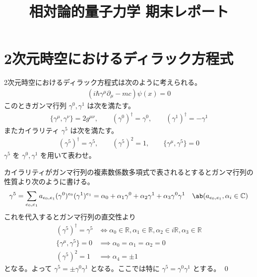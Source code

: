 \documentclass[uplatex,dvipdfmx,a4paper,11pt]{jlreq}
\title{相対論的量子力学 期末レポート}
\author{}
\makeatletter
\newcommand{\CC}{\mathbb{C}}
\newcommand{\RR}{\mathbb{R}}
\numberwithin{equation}{section}
\theoremstyle{definition}
\renewenvironment{proof}[1][\proofname]{\par
  \normalfont
  \topsep6\p@\@plus6\p@ \trivlist
  \item[\hskip\labelsep{\bfseries #1}\@addpunct{\bfseries}]\ignorespaces\quad\par
}{%
  \qed\endtrivlist\@endpefalse
}
\renewcommand\proofname{証明}
\makeatother
\begin{document}
\maketitle
\tableofcontents
\clearpage

\section{2次元時空におけるディラック方程式}
\begin{problem}
2次元時空におけるディラック方程式は次のように考えられる。
\begin{align}
  (i\hbar\gamma^\mu\partial_\mu - mc)\psi(x) = 0
\end{align}
このときガンマ行列 $\gamma^0, \gamma^1$ は次を満たす。
\begin{align}
  \lbrace\gamma^\mu, \gamma^\nu\rbrace = 2g^{\mu\nu}, \qquad (\gamma^0)^\dagger = \gamma^0, \qquad (\gamma^1)^\dagger = - \gamma^1
\end{align}
またカイラリティ $\gamma^5$ は次を満たす。
\begin{align}
  (\gamma^5)^\dagger = \gamma^5, \qquad (\gamma^5)^2 = 1, \qquad \lbrace\gamma^\mu, \gamma^5\rbrace = 0
\end{align}
$\gamma^5$ を $\gamma^0, \gamma^1$ を用いて表わせ。
\end{problem}
\begin{proof}
  カイラリティがガンマ行列の複素数係数多項式で表されるとするとガンマ行列の性質より次のように書ける。
  \begin{align}
    \gamma^5 & = \sum_{e_0, e_1}a_{e_0,e_1}(\gamma^0)^{e_0}(\gamma^1)^{e_1} = \alpha_0 + \alpha_1\gamma^0 + \alpha_2\gamma^1 + \alpha_3\gamma^0\gamma^1 & \ab(a_{e_0, e_1}, \alpha_i\in\CC)
  \end{align}
  これを代入するとガンマ行列の直交性より
  \begin{align}
    (\gamma^5)^\dagger = \gamma^5          & \iff \alpha_0\in\RR, \alpha_1\in\RR, \alpha_2\in i\RR, \alpha_3\in\RR \\
    \lbrace\gamma^\mu, \gamma^5\rbrace = 0 & \implies \alpha_0 = \alpha_1 = \alpha_2 = 0                           \\
    (\gamma^5)^2 = 1                       & \implies \alpha_4 = \pm 1
  \end{align}
  となる。よって $\gamma^5 = \pm \gamma^0\gamma^1$ となる。ここでは特に $\gamma^5 = \gamma^0\gamma^1$ とする。
\end{proof}
\end{document}
